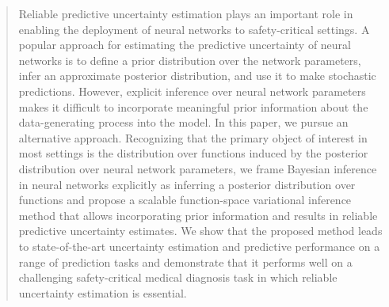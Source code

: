 \begin{abstract}
Reliable predictive uncertainty estimation plays an important role in enabling the deployment of neural networks to safety-critical settings. A popular approach for estimating the predictive uncertainty of neural networks is to define a prior distribution over the network parameters, infer an approximate posterior distribution, and use it to make stochastic predictions. However, explicit inference over neural network parameters makes it difficult to incorporate meaningful prior information about the data-generating process into the model. In this paper, we pursue an alternative approach. Recognizing that the primary object of interest in most settings is the distribution over functions induced by the posterior distribution over neural network parameters, we frame Bayesian inference in neural networks explicitly as inferring a posterior distribution over functions and propose a scalable function-space variational inference method that allows incorporating prior information and results in reliable predictive uncertainty estimates. We show that the proposed method leads to state-of-the-art uncertainty estimation and predictive performance on a range of prediction tasks and demonstrate that it performs well on a challenging safety-critical medical diagnosis task in which reliable uncertainty estimation is essential.
\end{abstract}